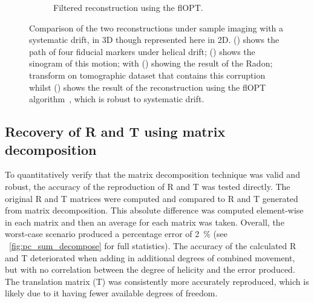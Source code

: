 \documentclass{osa-article}
\begin{document}
\begin{figure}
\begin{subfigure}[t]{0.3\linewidth}
\begin{tikzpicture}[node distance=0cm]
    \end{tikzpicture}
    \caption{Filtered reconstruction using the flOPT.}\label{fig:filtered_recon_helix}\label{fig:flopt_filter}
  \end{subfigure}
  \hspace*{\fill}
  \caption{Comparison of the two reconstructions under sample imaging with a systematic drift, in 3D though represented here in 2D. () shows the path of four fiducial markers under helical drift; () shows the sinogram of this motion; with () showing the result of the Radon; transform on tomographic dataset that contains this corruption whilst () shows the result of the reconstruction using the flOPT algorithm~\cite{craig_russell_2020_4073437}, which is robust to systematic drift.
  }\label{fig:flopts}
\end{figure}

\subsection*{Recovery of R and T using matrix decomposition}
To quantitatively verify that the matrix decomposition technique was valid and robust, the accuracy of the reproduction of \gls*{R} and \gls*{T} was tested directly.
The original \gls*{R} and \gls*{T} matrices were computed and compared to \gls*{R} and \gls*{T} generated from matrix decomposition. This absolute difference was computed element-wise in each matrix and then an average for each matrix was taken.
Overall, the worst-case scenario produced a percentage error of \SI{2}{\percent} (see \figurename~\ref{fig:pc_sum_decompose} for full statistics).
The accuracy of the calculated \gls*{R} and \gls*{T} deteriorated when adding in additional degrees of combined movement, but with no correlation between the degree of helicity and the error produced.
The translation matrix (\gls*{T}) was consistently more accurately reproduced, which is likely due to it having fewer available degrees of freedom.

\end{document}
